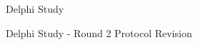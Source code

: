 \begin{figure}[h]
\centering
\caption{Delphi Study}
\end{figure}

\pagebreak{}

\begin{figure}[h]
\centering
{}
\caption{Delphi Study - Round 2 Protocol Revision}
\end{figure}
